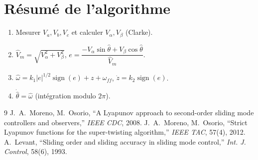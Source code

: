 \documentclass[11pt,a4paper]{article}
\newcommand{\sign}{\operatorname{sign}}
\newcommand{\hth}{\hat{\theta}}
\newcommand{\hw}{\hat{\omega}}
\begin{document}
\section{Résumé de l'algorithme}
\begin{enumerate}
  \item Mesurer $V_a,V_b,V_c$ et calculer $V_\alpha,V_\beta$ (Clarke).
  \item $\hat V_m=\sqrt{V_\alpha^2+V_\beta^2}$, \quad
        $e = \dfrac{-V_\alpha\sin\hth + V_\beta\cos\hth}{\hat V_m}$.
  \item $\hw = k_1|e|^{1/2}\sign(e) + z + \omega_{ff}$, \quad $\dot z = k_2\sign(e)$.
  \item $\dot\hth = \hw$ (intégration modulo $2\pi$).
\end{enumerate}

\begin{thebibliography}{9}
 J.~A.~Moreno, M.~Osorio, ``A Lyapunov approach to second-order sliding mode controllers and observers,'' \emph{IEEE CDC}, 2008.
 J.~A.~Moreno, M.~Osorio, ``Strict Lyapunov functions for the super-twisting algorithm,'' \emph{IEEE TAC}, 57(4), 2012.
 A.~Levant, ``Sliding order and sliding accuracy in sliding mode control,'' \emph{Int. J. Control}, 58(6), 1993.
\end{thebibliography}
\end{document}
